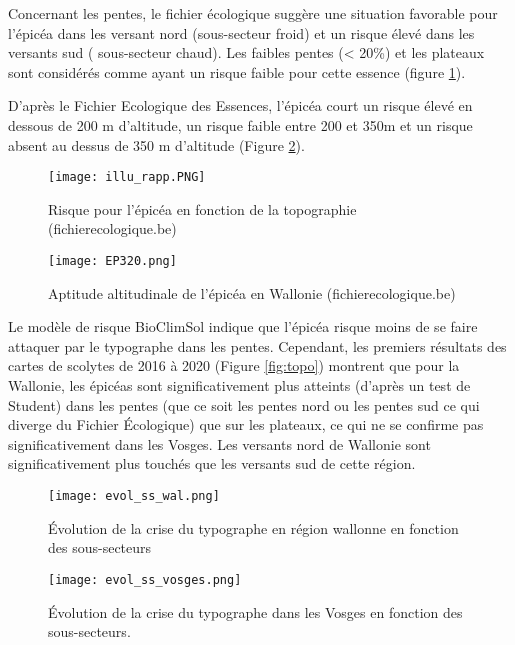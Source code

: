 Concernant les pentes, le fichier écologique suggère une situation favorable pour l'épicéa dans les versant nord (sous-secteur froid) et un risque élevé dans les versants sud ( sous-secteur chaud). Les faibles pentes (< 20\%) et les plateaux sont considérés comme ayant un risque faible pour cette essence (figure \ref{fig:ficheco}).

D'après le Fichier Ecologique des Essences, l'épicéa court un risque élevé en dessous de 200 m d'altitude, un risque faible entre 200 et 350m et un risque absent au dessus de 350 m d'altitude (Figure \ref{fig:fichalti}).  

\begin{figure} [htbp] 
	\centering
	\texttt{[image: illu\_rapp.PNG]}
	\caption{Risque pour l'épicéa en fonction de la topographie (fichierecologique.be)}
	\label{fig:ficheco}
\end{figure}

\begin{figure} [htbp] 
	\centering
	\texttt{[image: EP320.png]}
	\caption{Aptitude altitudinale de l'épicéa en Wallonie (fichierecologique.be)}
	\label{fig:fichalti}
\end{figure}

Le modèle de risque BioClimSol indique que l'épicéa risque moins de se faire attaquer par le typographe  dans les pentes.
Cependant, les premiers résultats des cartes de scolytes de 2016 à 2020 (Figure \ref{fig:topo}) montrent que pour la Wallonie, les épicéas sont significativement plus atteints (d'après un test de Student) dans les pentes (que ce soit les pentes nord ou les pentes sud ce qui diverge du Fichier Écologique) que sur les plateaux, ce qui ne se confirme pas significativement dans les Vosges.
Les versants nord de Wallonie sont significativement plus touchés que les versants sud de cette région. 

\begin{figure}[htbp]
	\begin{minipage}[b]{1 \linewidth}
		\centering
		\texttt{[image: evol\_ss\_wal.png]}
		\caption{Évolution de la crise du typographe en région wallonne en fonction des sous-secteurs}
		\label{fig:topo}
	\end{minipage}\hfill
	\vspace{0,5cm}
	\begin{minipage}[b]{1 \linewidth}
		\centering
		\texttt{[image: evol\_ss\_vosges.png]}
		\caption{Évolution de la crise du typographe dans les Vosges en fonction des sous-secteurs.}
		\label{fig:ss_vosges}
	\end{minipage}
\end{figure}




